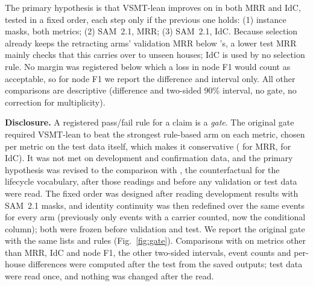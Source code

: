 The primary hypothesis is that VSMT-lean improves on  in both MRR and IdC, tested in a fixed order, each step only if the previous one holds: (1) instance masks, both metrics; (2) SAM~2.1, MRR; (3) SAM~2.1, IdC.
Because selection already keeps the retracting arms' validation MRR below 's, a lower test MRR mainly checks that this carries over to unseen houses; IdC is used by no selection rule.
No margin was registered below which a loss in node F1 would count as acceptable, so for node F1 we report the difference and interval only.
All other comparisons are descriptive (difference and two-sided 90\% interval, no gate, no correction for multiplicity).

\textbf{Disclosure.}
A registered pass/fail rule for a claim is a \emph{gate}.
The original gate required VSMT-lean to beat the strongest rule-based arm on each metric, chosen per metric on the test data itself, which makes it conservative ( for MRR,  for IdC).
It was not met on development and confirmation data, and the primary hypothesis was revised to the comparison with , the counterfactual for the lifecycle vocabulary, after those readings and before any validation or test data were read.
The fixed order was designed after reading development results with SAM~2.1 masks, and identity continuity was then redefined over the same events for every arm (previously only events with a carrier counted, now the conditional column); both were frozen before validation and test.
We report the original gate with the same lists and rules (Fig.~\ref{fig:gate}).
Comparisons with  on metrics other than MRR, IdC and node F1, the other two-sided intervals, event counts and per-house differences were computed after the test from the saved outputs; test data were read once, and nothing was changed after the read.
